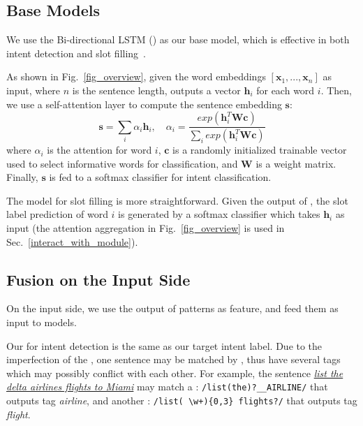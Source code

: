 \subsection{Base Models}
We use the Bi-directional LSTM (\BLSTM) as our base \NN model, which is effective in both intent detection and slot
filling~\cite{liu2016attention}.

As shown in Fig.~\ref{fig_overview}, given the word embeddings $[\textbf{x}_1, ..., \textbf{x}_n]$ as input, where $n$ is the sentence length, \BLSTM outputs a vector $\textbf{h}_i$ for each word $i$.
Then, we use a self-attention layer to compute the sentence embedding $\textbf{s}$:
\begin{equation}
\textbf{s} = \sum_{i}{\alpha_i\textbf{h}_i}, \quad \alpha_i=\frac{exp(\textbf{h}_i^T\textbf{Wc})}{\sum_{i}{exp(\textbf{h}_i^T\textbf{Wc})}}
\label{eq:simple_att}
\end{equation}
where  $\alpha_i$ is the attention for word $i$, $\textbf{c}$ is a randomly initialized trainable vector used to select informative words for classification, and $\textbf{W}$ is a weight matrix.
Finally, $\textbf{s}$ is fed to a softmax classifier for intent classification.

The model for slot filling is more straightforward. Given the output of \BLSTM, the slot label prediction of word $i$ is generated by a
softmax classifier which takes $\textbf{h}_i$ as input (the attention aggregation in Fig.~\ref{fig_overview} is used in Sec.~\ref{interact_with_module}).


\subsection{Fusion on the Input Side}
\label{fusion_with_input}
On the input side, we use the output of \RE patterns as feature, and feed them as input to \NN models.

Our \REtag for intent detection is the same as our target intent label.
Due to the imperfection of the \REs, one sentence may be matched by \REs, thus have several \RE tags which may possibly conflict with each other. For example, the
sentence \textsl{\underline{list the delta airlines flights to Miami}} may match a \RE: {\small \texttt{/list(\;the)?\;\_\_AIRLINE/}} that outputs
tag \emph{airline}, and another \RE: {\small \texttt{/list(\,\textbackslash w+)\{0,3\} flights?/}} that outputs tag \emph{flight}.

